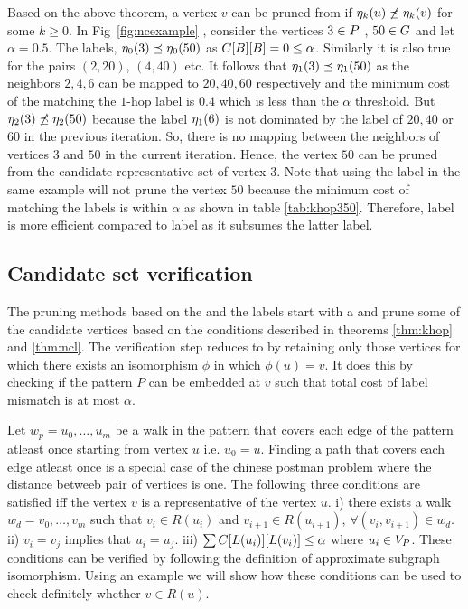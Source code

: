 Based on the above theorem, a vertex $v$ can be pruned from \CR if $\eta_{k}(u)
\not\preceq \eta_{k}(v)$ for some $k \geq 0$. In Fig~\ref{fig:ncexample} ,
consider the vertices $3 \in P$ , $50 \in G$ and let $\alpha = 0.5$. The
\ncl labels, $\eta_{0}(3) \preceq \eta_{0}(50)$ as ${C}[B][B] = 0 \leq
\alpha$.  Similarly it is also true for the pairs $(2, 20)$, $(4, 40)$ etc. It
follows that $\eta_{1}(3) \preceq \eta_{1}(50)$ as the neighbors $2, 4, 6$ can
be mapped to $20, 40, 60$ respectively and  the minimum cost of the matching the
$1$-hop label is $0.4$ which is less than the $\alpha$ threshold. But
$\eta_{2}(3) \not\preceq \eta_{2}(50)$ because the \ncl label $\eta_{1}(6)$
is not dominated by the \ncl label of $20, 40$ or  $60$ in the previous
iteration. So, there is no mapping between the neighbors of vertices $3$ and
$50$ in the current iteration. Hence, the vertex $50$ can be pruned from the
candidate representative set of vertex $3$.  Note that using the \khop label in
the same example will not prune the vertex $50$ because the minimum cost of
matching the \khop labels is within $\alpha$ as shown in table
\ref{tab:khop350}. Therefore, \ncl label is more efficient compared to \khop
label as it subsumes the latter label.

\subsection{Candidate set verification} \label{sec:verification} The pruning
methods based on the \khop and the \ncl labels start with a \CR and prune some
of the candidate vertices based on the conditions described in theorems
\ref{thm:khop} and \ref{thm:ncl}.  The verification step reduces \CR to \RS by
retaining only those vertices for which there exists an isomorphism $\phi$ in
which $\phi(u) = v$.  It does this by checking if the pattern $P$ can be
embedded at $v$ such that total cost of label mismatch is at most $\alpha$.


Let $w_p = u_0,\ldots, u_m$ be a walk in the pattern that covers each edge of
the pattern atleast once starting from vertex $u$ i.e. $u_0 = u$. Finding a path
that covers each edge atleast once is a special case of the chinese postman
problem \cite{chinesepostman} where the distance betweeb pair of vertices is
one. The following three conditions are satisfied iff the vertex $v$ is a
representative of the vertex $u$. i) there exists a walk $w_d = v_0,\ldots, v_m$
such that $v_i \in R(u_i)$ and $v_{i+1} \in R(u_{i+1})$, $\forall (v_i, v_{i+1})
\in w_d$.  ii) $v_i = v_j$ implies that $u_i = u_j$. iii)
$\sum{C}[L(u_i)][L(v_i)] \leq \alpha$ where $u_i \in V_P$. These
conditions can be verified by following the definition of approximate subgraph
isomorphism. Using an example we will show how these conditions can be used to
check definitely whether $v \in R(u)$.

